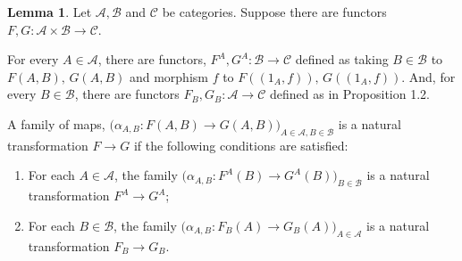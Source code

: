 \documentclass[a4paper]{article}
\theoremstyle{definition}
\newtheorem{lemma}[theorem]{Lemma}
\begin{document}
	\begin{lemma}
		Let $\mathcal{A},\mathcal{B}$ and $\mathcal{C}$ be categories. Suppose there
		are functors $F,G:\mathcal{A} \times \mathcal{B} \to \mathcal{C}$.

		For every $A\in \mathcal{A}$, there are functors, $F^A,G^A:\mathcal{B} \to \mathcal{C}$
		defined as taking $B \in \mathcal{B}$ to $F(A,B),\, G(A,B)$ and
		morphism $f$ to $F((1_A,f)),\, G((1_A,f)) $. And, for every $B\in \mathcal{B}$,
		there are functors $F_B,G_B:\mathcal{A} \to \mathcal{C}$ defined as
		in Proposition 1.2.

		A family of maps, $\big( \alpha_{A,B}: F(A,B) \to G(A,B)
		\big)_{A \in \mathcal{A} , B \in \mathcal{B} } $ is a natural transformation
		$F \to G$ if the following conditions are satisfied:
		\begin{enumerate}[label=(\roman*)]
			\item For each $A \in \mathcal{A}$, the family
				$\big( \alpha_{A,B}: F^A(B) \to G^A(B) \big)_{ B \in \mathcal{B} } $ is
				a natural transformation $F^A \to G^A$;
			\item For each $B \in \mathcal{B}$, the family
				$\big( \alpha_{A,B}: F_B(A) \to G_B(A) \big)_{ A \in \mathcal{A} } $ is
				a natural transformation $F_B \to G_B$.
		\end{enumerate}
	\end{lemma}
\end{document}
